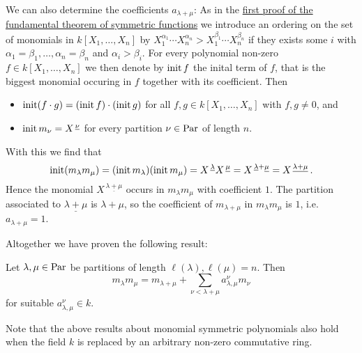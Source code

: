 \begin{fluff}
  We can also determine the coefficients $a_{\lambda + \mu}$:
  As in the \hyperref[label: first proof of fundamental theorem]{first proof of the fundamental theorem of symmetric functions} we introduce an ordering on the set of monomials in $k[X_1, \dotsc, X_n]$ by $X_1^{\alpha_1} \dotsm X_n^{\alpha_n} > X_1^{\beta_1} \dotsm X_n^{\beta_n}$ if they exists some $i$ with $\alpha_1 = \beta_1, \dotsc, \alpha_n = \beta_n$ and $\alpha_i > \beta_i$.
  For every polynomial non-zero $f \in k[X_1, \dotsc, X_n]$ we then denote by $\operatorname{init} f$ the inital term of $f$, that is the biggest monomial occuring in $f$ together with its coefficient.
  Then
  \begin{itemize}
    \item
      $\operatorname{init}(f \cdot g) = (\operatorname{init} f) \cdot (\operatorname{init} g)$ for all $f, g \in k[X_1, \dotsc, X_n]$ with $f, g \neq 0$, and
    \item
      $\operatorname{init} m_\nu = X^{\,\underline{\nu}}$ for every partition $\nu \in \operatorname{Par}$ of length $n$.
  \end{itemize}
  With this we find that
  \[
      \operatorname{init}(m_\lambda m_\mu)
    = (\operatorname{init} m_\lambda) (\operatorname{init} m_\mu)
    = X^{\,\underline{\lambda}} X^{\,\underline{\mu}}
    = X^{\,\underline{\lambda} + \underline{\mu}}
    = X^{\,\underline{\lambda + \mu}} \,.
  \]
  Hence the monomial $X^{\,\underline{\lambda + \mu}}$ occurs in $m_\lambda m_\mu$ with coefficient $1$.
  The partition associated to $\underline{\lambda + \mu}$ is $\lambda + \mu$, so the coefficient of $m_{\lambda + \mu}$ in $m_\lambda m_\mu$ is $1$, i.e.\ $a_{\lambda + \mu} = 1$.
  
  Altogether we have proven the following result:
\end{fluff}


\begin{lemma}
  Let $\lambda, \mu \in \operatorname{Par}$ be partitions of length $\ell(\lambda), \ell(\mu) = n$.
  Then
  \[
        m_{\lambda} m_{\mu}
    =   m_{\lambda + \mu}
      + \sum_{\nu < \lambda + \mu} a^\nu_{\lambda,\mu} m_\nu
  \]
  for suitable $a^\nu_{\lambda,\mu} \in k$.
\end{lemma}


\begin{remark}
  Note that the above results about monomial symmetric polynomials also hold when the field $k$ is replaced by an arbitrary non-zero commutative ring.
\end{remark}






